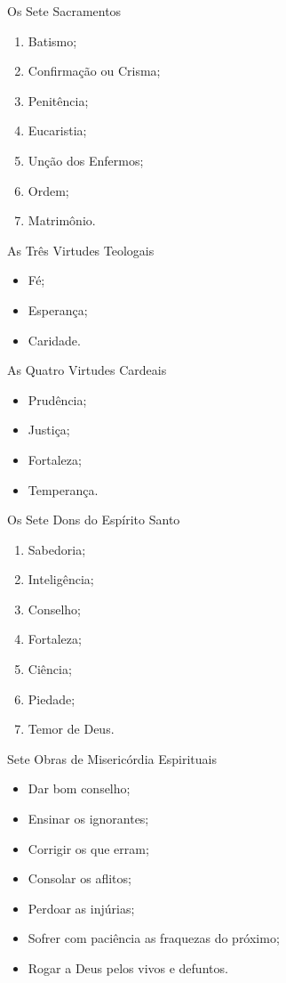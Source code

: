 \documentclass{book}
\begin{document}
\begin{center}
    Os Sete Sacramentos
\end{center}
\begin{enumerate}
    \item Batismo;
    \item Confirmação ou Crisma;
    \item Penitência;
    \item Eucaristia;
    \item Unção dos Enfermos;
    \item Ordem;
    \item Matrimônio.
\end{enumerate}
\begin{center}
    As Três Virtudes Teologais
\end{center}
\begin{itemize}
    \item Fé;
    \item Esperança;
    \item Caridade.
\end{itemize}
\newpage
\begin{center}
    As Quatro Virtudes Cardeais
\end{center}
\begin{itemize}
    \item Prudência;
    \item Justiça;
    \item Fortaleza;
    \item Temperança.
\end{itemize}
\begin{center}
    Os Sete Dons do Espírito Santo
\end{center}
\begin{enumerate}
    \item Sabedoria;
    \item Inteligência;
    \item Conselho;
    \item Fortaleza;
    \item Ciência;
    \item Piedade;
    \item Temor de Deus.
\end{enumerate}
\begin{center}
    Sete Obras de Misericórdia Espirituais
\end{center}
\begin{itemize}
    \item Dar bom conselho;
    \item Ensinar os ignorantes;
    \item Corrigir os que erram;
    \item Consolar os aflitos;
    \item Perdoar as injúrias;
    \item Sofrer com paciência as fraquezas do próximo;
    \item Rogar a Deus pelos vivos e defuntos.
\end{itemize}
\end{document}

